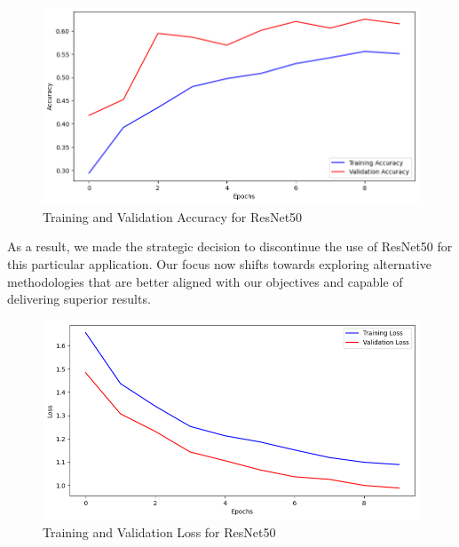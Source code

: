 \documentclass[conference]{IEEEtran}
\begin{document}
\begin{figure}[H]
    \centering
    \includegraphics[width=1\linewidth]{images//ResNet50/Training_Validation_Accuracy_Resnet50.png}
    \caption{Training and Validation Accuracy for ResNet50}
    \label{fig:TV_Resnet}
\end{figure}


As a result, we made the strategic decision to discontinue the use of ResNet50 for this particular application. Our focus now shifts towards exploring alternative methodologies that are better aligned with our objectives and capable of delivering superior results.

\begin{figure}[H]
    \centering
    \includegraphics[width=1\linewidth]{images//ResNet50/Training_Validation_Loss_Resnet50.png}
    \caption{Training and Validation Loss for ResNet50}
    \label{fig:TV_Loss_Resnet}
\end{figure}
\end{document}
